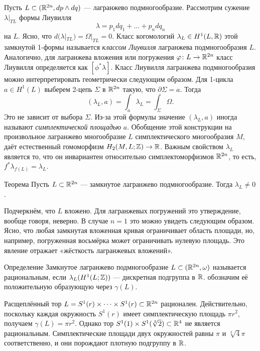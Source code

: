 Пусть $L \subset (\mathbb{R}^{2n}, dp \wedge dq)$ --- лагранжево подмногообразие.
Рассмотрим сужение $\lambda|_{TL}$ формы Лиувилля 
\[\lambda = p_1 dq_1+\dots+ p_n dq_n\]
на $L$.
Ясно, что $d (\lambda|_{TL}) = \Omega|_{TL} = 0$.
Класс когомологий $\lambda_L \in H^1 (L, \mathbb{R})$ этой замкнутой 1-формы называется \emph{классом Лиувилля} лагранжева подмногообразия $L$.
Аналогично, для лагранжева вложения или погружения $\varphi\colon L \to \mathbb{R}^{2n}$ класс Лиувилля определяется как $[\phi^\ast \lambda]$.
Класс Лиувилля лагранжева подмногообразия можно интерпретировать геометрически следующим образом.
Для 1-цикла $a\in H^1 (L)$ выберем 2-цепь $\Sigma$ в $\mathbb{R}^{2n}$ такую, что $\partial\Sigma = a$.
Тогда
\[(\lambda_L, a) = \int_a\lambda_L = \int_\Sigma\Omega.\]
Это  не зависит от выбора $\Sigma$.
Из-за этой формулы значение $(\lambda_L, a)$ иногда называют \emph{симплектической площадью} $a$.
Обобщение этой конструкции на произвольное лагранжево многообразие $L$
 симплектического многообразия $M$, даёт естественный гомоморфизм $H_2 (M, L; \mathbb{Z}) \to \mathbb{R}$.
Важным свойством  $\lambda_L$ является то, что он инвариантен относительно симплектоморфизмов $\mathbb{R}^{2n}$,
то есть,
$f^\ast \lambda_{f (L)} = \lambda_L$.

\begin{thm}[(\cite{G1})]{Теорема}\label{3.2.A}
Пусть $L \subset \mathbb{R}^{2n}$ --- замкнутое лагранжево подмногообразие.
Тогда $\lambda_L \ne 0$.
\end{thm}

Подчеркнём, что $L$ вложено.
Для лагранжевых погружений это утверждение, вообще говоря, неверно.
В случае $n = 1$ это можно увидеть следующим образом.
Ясно, что любая замкнутая вложенная кривая ограничивает область
 площади, но, например, погруженная восьмёрка может ограничивать нулевую площадь.
Это явление отражает «жёсткость лагранжевых вложений».

\begin{thm*}{Определение}
Замкнутое лагранжево подмногообразие $L \subset (\mathbb{R}^{2n}, \omega)$
называется рациональным, если $\lambda_L (H^1 (L; \mathbb{Z}))$ ---
дискретная подгруппа в $\mathbb{R}$.   обозначим её
положительную образующую через $\gamma (L)$.
\end{thm*}

Расщеплённый тор $L = S^1 (r) \times\dots\times S^1 (r) \subset
\mathbb{R}^{2n}$ рационален. 
Действительно, поскольку каждая окружность $S^1 (r)$ имеет
симплектическую площадь $\pi r^2$, получаем $\gamma (L) = \pi r^2$. 
Однако тор $S^1(1)\times S^1(\sqrt[3]{2}) \subset \mathbb{R}^4$ не является
рациональным.
Симплектические площади двух окружностей равны $\pi$  и
$\sqrt[3]{4}\pi$ соответственно, и они порождают плотную подгруппу в
$\mathbb{R}$.


